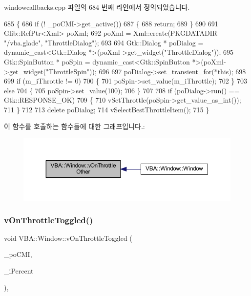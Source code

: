 windowcallbacks.\+cpp 파일의 684 번째 라인에서 정의되었습니다.


\begin{DoxyCode}
685 \{
686   \textcolor{keywordflow}{if} (! \_poCMI->get\_active())
687   \{
688     \textcolor{keywordflow}{return};
689   \}
690 
691   Glib::RefPtr<Xml> poXml;
692   poXml = Xml::create(PKGDATADIR \textcolor{stringliteral}{"/vba.glade"}, \textcolor{stringliteral}{"ThrottleDialog"});
693 
694   Gtk::Dialog * poDialog = \textcolor{keyword}{dynamic\_cast<}Gtk::Dialog *\textcolor{keyword}{>}(poXml->get\_widget(\textcolor{stringliteral}{"ThrottleDialog"}));
695   Gtk::SpinButton * poSpin = \textcolor{keyword}{dynamic\_cast<}Gtk::SpinButton *\textcolor{keyword}{>}(poXml->get\_widget(\textcolor{stringliteral}{"ThrottleSpin"}));
696 
697   poDialog->set\_transient\_for(*\textcolor{keyword}{this});
698 
699   \textcolor{keywordflow}{if} (m\_iThrottle != 0)
700   \{
701     poSpin->set\_value(m\_iThrottle);
702   \}
703   \textcolor{keywordflow}{else}
704   \{
705     poSpin->set\_value(100);
706   \}
707 
708   \textcolor{keywordflow}{if} (poDialog->run() == Gtk::RESPONSE\_OK)
709   \{
710     vSetThrottle(poSpin->get\_value\_as\_int());
711   \}
712 
713   \textcolor{keyword}{delete} poDialog;
714   vSelectBestThrottleItem();
715 \}
\end{DoxyCode}
이 함수를 호출하는 함수들에 대한 그래프입니다.\+:
\nopagebreak
\begin{figure}[H]
\begin{center}
\leavevmode
\includegraphics[width=350pt]{class_v_b_a_1_1_window_a3d2033ebb1a3ef25bada10bef93e856a_icgraph}
\end{center}
\end{figure}
\mbox{\label{class_v_b_a_1_1_window_a86f6a68bfbf9928605aa80a543d49038}} 
\subsubsection{\texorpdfstring{v\+On\+Throttle\+Toggled()}{vOnThrottleToggled()}}
{\footnotesize\ttfamily void V\+B\+A\+::\+Window\+::v\+On\+Throttle\+Toggled (\begin{DoxyParamCaption}\item[{Gtk\+::\+Check\+Menu\+Item $\ast$}]{\+\_\+po\+C\+MI,  }\item[{\mbox{\hyperlink{_util_8cpp_a0ef32aa8672df19503a49fab2d0c8071}{int}}}]{\+\_\+i\+Percent }\end{DoxyParamCaption})\hspace{0.3cm}{\ttfamily [protected]}, {\ttfamily [virtual]}}



